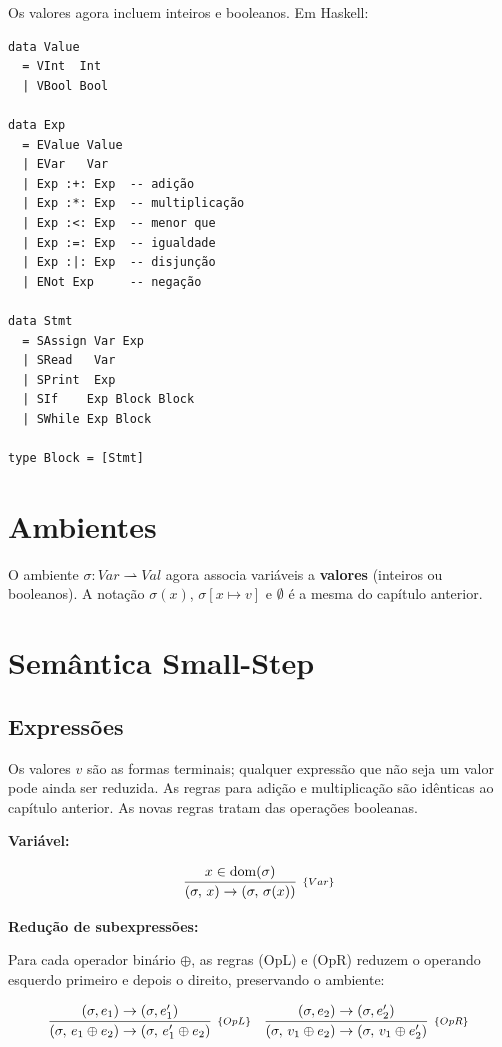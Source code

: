 Os valores agora incluem inteiros e booleanos. Em Haskell:

\begin{verbatim}
data Value
  = VInt  Int
  | VBool Bool

data Exp
  = EValue Value
  | EVar   Var
  | Exp :+: Exp  -- adição
  | Exp :*: Exp  -- multiplicação
  | Exp :<: Exp  -- menor que
  | Exp :=: Exp  -- igualdade
  | Exp :|: Exp  -- disjunção
  | ENot Exp     -- negação

data Stmt
  = SAssign Var Exp
  | SRead   Var
  | SPrint  Exp
  | SIf    Exp Block Block
  | SWhile Exp Block

type Block = [Stmt]
\end{verbatim}

\section{Ambientes}

O ambiente \(\sigma : \mathit{Var} \rightharpoonup \mathit{Val}\)
agora associa variáveis a \textbf{valores} (inteiros ou booleanos).
A notação \(\sigma(x)\), \(\sigma[x \mapsto v]\) e \(\emptyset\) é a
mesma do capítulo anterior.

\section{Semântica Small-Step}

\subsection{Expressões}

Os valores \(v\) são as formas terminais; qualquer expressão que
não seja um valor pode ainda ser reduzida. As regras para adição e
multiplicação são idênticas ao capítulo anterior. As novas regras
tratam das operações booleanas.

\textbf{Variável:}

\[
  \infer[_{\{Var\}}]{(\sigma,\, x) \to (\sigma,\, \sigma(x))}{x \in
  \mathrm{dom}(\sigma)}
\]

\textbf{Redução de subexpressões:}

Para cada operador binário \(\oplus\), as regras (OpL) e (OpR)
reduzem o operando esquerdo primeiro e depois o direito,
preservando o ambiente:

\[
  \begin{array}{cc}
    \infer[_{\{OpL\}}]{(\sigma,\, e_1 \oplus e_2)\to (\sigma,\, e_1'
    \oplus e_2)}{(\sigma, e_1) \to (\sigma, e_1')}
    &
    \infer[_{\{OpR\}}]{(\sigma,\, v_1 \oplus e_2)\to (\sigma,\, v_1
    \oplus e_2')}{(\sigma, e_2) \to (\sigma, e_2')}
  \end{array}
\]

